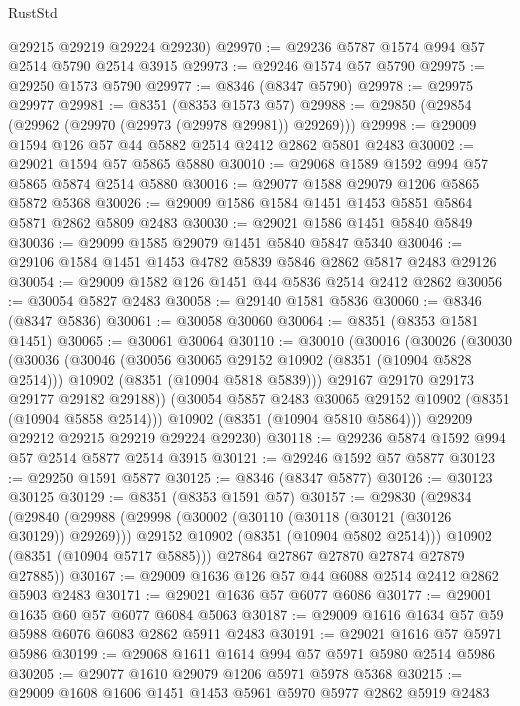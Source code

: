 \begin{lexlean}{RustStd}
\begin{coremodule}
      @29215
      @29219
      @29224
      @29230)
@29970 := @29236 @5787 @1574 @994 @57 @2514 @5790 @2514 @3915
@29973 := @29246 @1574 @57 @5790
@29975 := @29250 @1573 @5790
@29977 := @8346 (@8347 @5790)
@29978 := @29975 @29977
@29981 := @8351 (@8353 @1573 @57)
@29988 := @29850 (@29854 (@29962 (@29970 (@29973 (@29978 @29981)) @29269)))
@29998 := @29009 @1594 @126 @57 @44 @5882 @2514 @2412 @2862 @5801 @2483
@30002 := @29021 @1594 @57 @5865 @5880
@30010 := @29068 @1589 @1592 @994 @57 @5865 @5874 @2514 @5880
@30016 := @29077 @1588 @29079 @1206 @5865 @5872 @5368
@30026 := @29009 @1586 @1584 @1451 @1453 @5851 @5864 @5871 @2862 @5809 @2483
@30030 := @29021 @1586 @1451 @5840 @5849
@30036 := @29099 @1585 @29079 @1451 @5840 @5847 @5340
@30046 := @29106 @1584 @1451 @1453 @4782 @5839 @5846 @2862 @5817 @2483 @29126
@30054 := @29009 @1582 @126 @1451 @44 @5836 @2514 @2412 @2862
@30056 := @30054 @5827 @2483
@30058 := @29140 @1581 @5836
@30060 := @8346 (@8347 @5836)
@30061 := @30058 @30060
@30064 := @8351 (@8353 @1581 @1451)
@30065 := @30061 @30064
@30110 := @30010
    (@30016
      (@30026
        (@30030
          (@30036
            (@30046
              (@30056 @30065 @29152 @10902 (@8351 (@10904 @5828 @2514)))
              @10902
              (@8351 (@10904 @5818 @5839)))
            @29167
            @29170
            @29173
            @29177
            @29182
            @29188))
        (@30054 @5857 @2483 @30065 @29152 @10902 (@8351 (@10904 @5858 @2514)))
        @10902
        (@8351 (@10904 @5810 @5864)))
      @29209
      @29212
      @29215
      @29219
      @29224
      @29230)
@30118 := @29236 @5874 @1592 @994 @57 @2514 @5877 @2514 @3915
@30121 := @29246 @1592 @57 @5877
@30123 := @29250 @1591 @5877
@30125 := @8346 (@8347 @5877)
@30126 := @30123 @30125
@30129 := @8351 (@8353 @1591 @57)
@30157 := @29830
    (@29834
      (@29840
        (@29988
          (@29998
            (@30002 (@30110 (@30118 (@30121 (@30126 @30129)) @29269)))
            @29152
            @10902
            (@8351 (@10904 @5802 @2514)))
          @10902
          (@8351 (@10904 @5717 @5885)))
        @27864
        @27867
        @27870
        @27874
        @27879
        @27885))
@30167 := @29009 @1636 @126 @57 @44 @6088 @2514 @2412 @2862 @5903 @2483
@30171 := @29021 @1636 @57 @6077 @6086
@30177 := @29001 @1635 @60 @57 @6077 @6084 @5063
@30187 := @29009 @1616 @1634 @57 @59 @5988 @6076 @6083 @2862 @5911 @2483
@30191 := @29021 @1616 @57 @5971 @5986
@30199 := @29068 @1611 @1614 @994 @57 @5971 @5980 @2514 @5986
@30205 := @29077 @1610 @29079 @1206 @5971 @5978 @5368
@30215 := @29009 @1608 @1606 @1451 @1453 @5961 @5970 @5977 @2862 @5919 @2483

\end{coremodule}
\end{lexlean}
